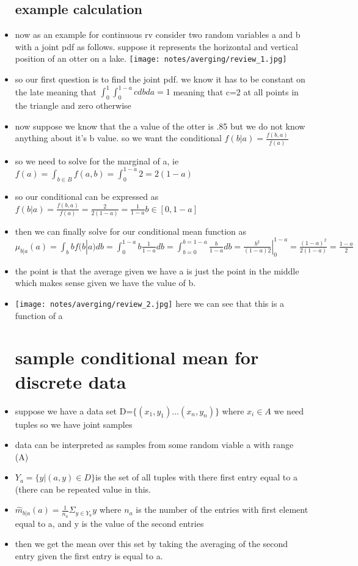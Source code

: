 \documentclass{article}
\begin{document}
\begin{itemize}
\subsection{example calculation}
\item now as an example for continuous rv consider two random variables a and b with a joint pdf as follows. suppose it represents the  horizontal and vertical position of an otter on a lake.
\texttt{[image: notes/averging/review\_1.jpg]}
\item so our first question is to find the joint pdf. we know it has to be constant on the late meaning that $\int_{0}^{1}\int_{0}^{1-a}cdbda=1$ meaning that c=2 at all points in the triangle and zero otherwise  
\item now suppose we know that the a value of the otter is .85 but we do not know anything about it's b value. so we want the conditional $f(b|a)=\frac{f(b,a)}{f(a)}$ 
\item so we need to solve for the marginal of a, ie $f(a)=\int_{b\in B}f(a,b)=\int_{0}^{1-a}2=2(1-a)$
\item so our conditional can be expressed as $f(b|a)=\frac{f(b,a)}{f(a)}=\frac{2}{2(1-a)}=\frac{1}{1-a} b\in [0,1-a]$ 
\item then we can finally solve for our conditional mean function as $\mu_{b|a}(a)=\int_b bf(b|a) db=\int_{0}^{1-a}b\frac{1}{1-a}db=\int_{b=0}^{b=1-a}\frac{b}{1-a}db=\frac{b^2}{(1-a)2}|_{0}^{1-a}=\frac{(1-a)^2}{2(1-a)}=\frac{1-a}{2}$
\item the point is that the average given we have a is just the point in the middle which makes sense given we have the value of b. 
\item \texttt{[image: notes/averging/review\_2.jpg]} here we can see that this is a function of a
\section{sample conditional mean for discrete data}
\item suppose we have a data set D=$\{(x_1,y_1)...(x_n,y_n)\}$ where $x_i\in A$ we need tuples so we have joint samples
\item data can be interpreted as samples from some random viable a with range (A)
\item $Y_a=\{y|(a,y)\in D\}$is the set of all tuples with there first entry equal to a (there can be repeated value in this. 
\item $ \hat{m}_{b|a}(a)=\frac{1}{n_a}\Sigma_{y\in Y_a}y
$ where $n_a$ is the number of the entries with first element equal to a, and y is the value of the second entries
\item then we get the mean over this set by taking the averaging of the second entry given the first entry is equal to a. 

\end{itemize}
\end{document}
